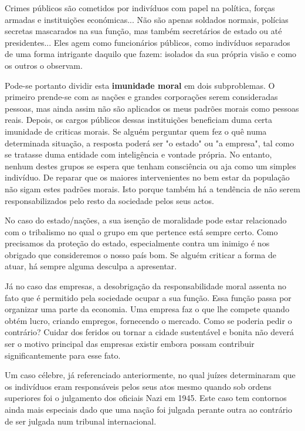 \documentclass[a4paper,onecolumn,11pt]{article}
\begin{document}
		Crimes públicos são cometidos por indivíduos com papel na política, forças armadas e instituições económicas... Não são apenas soldados normais, polícias secretas mascarados na sua função, mas também secretários de estado ou até presidentes... Eles agem como funcionários públicos, como indivíduos separados de uma forma intrigante daquilo que fazem: isolados da sua própria visão e como os outros o observam. \cite{maxwell}

		Pode-se portanto dividir esta \textbf{imunidade moral} em dois subproblemas. O primeiro prende-se com as nações e grandes corporações serem consideradas pessoas, mas ainda assim não são aplicados os meus padrões morais como pessoas reais. Depois, os cargos públicos dessas instituições beneficiam duma certa imunidade de criticas morais. Se alguém perguntar quem fez o quê numa determinada situação, a resposta poderá ser "o estado" ou "a empresa", tal como se tratasse duma entidade com inteligência e vontade própria. No entanto, nenhum destes grupos se espera que tenham consciência ou aja como um simples indivíduo. De reparar que os maiores intervenientes no bem estar da população não sigam estes padrões morais. Isto porque também há a tendência de não serem responsabilizados pelo resto da sociedade pelos seus actos. 

		No caso do estado/nações, a sua isenção de moralidade pode estar relacionado com o tribalismo no qual o grupo em que pertence está sempre certo. Como precisamos da proteção do estado, especialmente contra um inimigo é nos obrigado que consideremos o nosso país bom. Se alguém criticar a forma de atuar, há sempre alguma desculpa a apresentar.

		Já no caso das empresas, a desobrigação da responsabilidade moral assenta no fato que é permitido pela sociedade ocupar a sua função. Essa função passa por organizar uma parte da economia. Uma empresa faz o que lhe compete quando obtém lucro, criando empregos, fornecendo o mercado. Como se poderia pedir o contrário? Cuidar dos feridos ou tornar a cidade sustentável e bonita não deverá ser o motivo principal das empresas existir embora possam contribuir significantemente para esse fato.
		
		Um caso célebre, já referenciado anteriormente, no qual juízes determinaram que os indivíduos eram responsáveis pelos seus atos mesmo quando sob ordens superiores foi o julgamento dos oficiais Nazi em 1945. Este caso tem contornos ainda mais especiais dado que uma nação foi julgada perante outra ao contrário de ser julgada num tribunal internacional.
		
\end{document}
